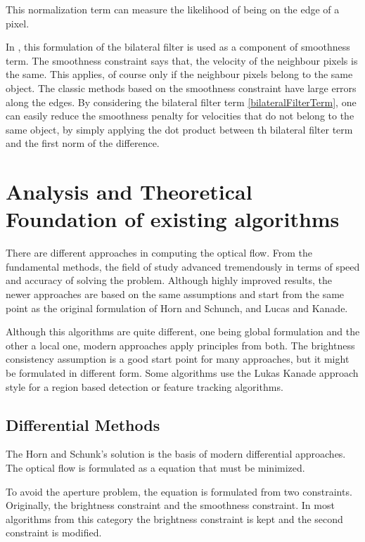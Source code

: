 \documentclass[12pt,a4paper,twoside]{report}
\begin{document}
This normalization term can measure the likelihood of being on the edge of a pixel. 

In \cite{drulea2013}, this formulation of the bilateral filter is used as a component of smoothness term. The smoothness constraint says that, the velocity of the neighbour pixels is the same. This applies, of course only if the neighbour pixels belong to the same object. The classic methods based on the smoothness constraint have large errors along the edges. By considering the bilateral filter term \ref{bilateralFilterTerm}, one can easily reduce the smoothness penalty for velocities that do not belong to the same object, by simply applying the dot product between th bilateral filter term and the first norm of the difference. 

\chapter{Analysis and Theoretical Foundation of existing algorithms}
\label{ch:analysis}

There are different approaches in computing the optical flow. From the fundamental methods, the field of study advanced tremendously in terms of speed and accuracy of solving the problem. Although highly improved results, the newer approaches are based on the same assumptions and start from the same point as the original formulation of Horn and Schunch, and Lucas and Kanade. 

Although this algorithms are quite different, one being global formulation and the other a local one, modern approaches apply principles from both. The brightness consistency assumption is a good start point for many approaches, but it might be formulated in different form. Some algorithms use the Lukas Kanade approach style for a region based detection or feature tracking algorithms.




\section{Differential Methods}
The Horn and Schunk's solution is the basis of modern differential approaches. The optical flow is formulated as a equation that must be minimized.

To avoid the aperture problem, the equation is formulated from two constraints. Originally, the brightness constraint and the smoothness constraint. In most algorithms from this category the brightness constraint is kept and the second constraint is modified.
\end{document}
